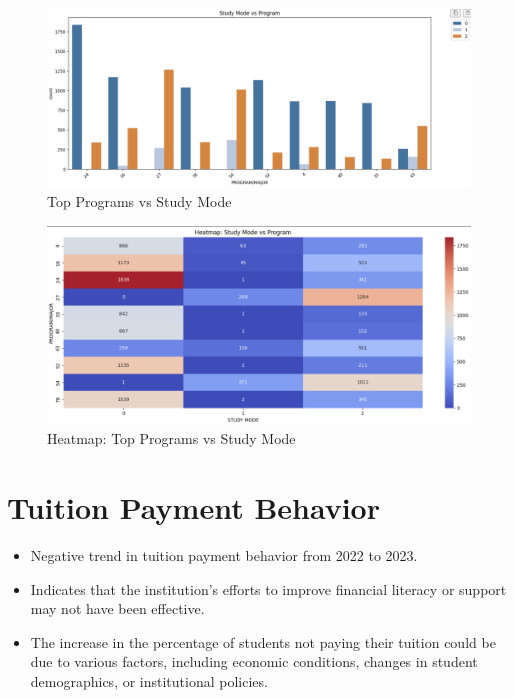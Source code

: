 \documentclass[12pt]{article}
\begin{document}
\begin{figure}[H]
    \centering
    \includegraphics[width=0.9\linewidth]{study_mode.png}
    \caption{Top Programs vs Study Mode}
\end{figure}

\begin{figure}[H]
    \centering
    \includegraphics[width=0.9\linewidth]{heatmap_study_mode.png}
    \caption{Heatmap: Top Programs vs Study Mode}
\end{figure}

\section{Tuition Payment Behavior}

\begin{itemize}
    \item Negative trend in tuition payment behavior from 2022 to 2023.
    \item Indicates that the institution's efforts to improve financial literacy or support may not have been effective.
    \item The increase in the percentage of students not paying their tuition could be due to various factors, including economic conditions, changes in student demographics, or institutional policies.
\end{itemize}
\end{document}
